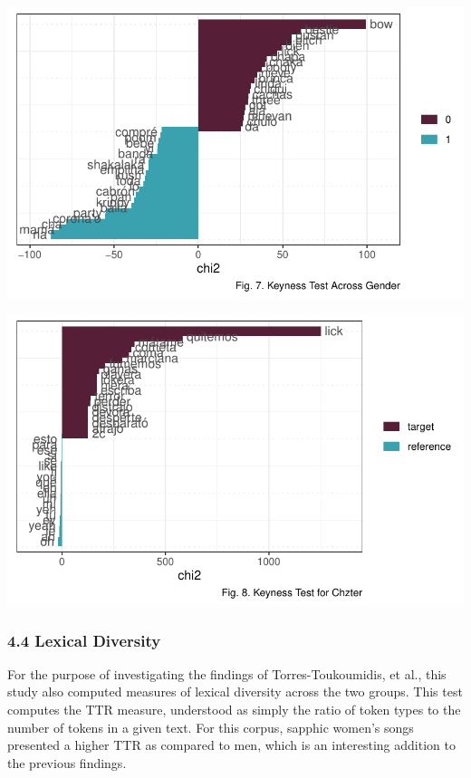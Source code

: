 \documentclass[
  letterpaper,
  DIV=11,
  numbers=noendperiod]{scrartcl}
\begin{document}
\includegraphics{Sastoque_Essay3_files/figure-pdf/keyness-1.pdf}

\includegraphics{Sastoque_Essay3_files/figure-pdf/keyness-2.pdf}

\hypertarget{lexical-diversity}{%
\subsubsection{\texorpdfstring{4.4 \textbf{Lexical
Diversity}}{4.4 Lexical Diversity}}\label{lexical-diversity}}

For the purpose of investigating the findings of Torres-Toukoumidis, et
al., this study also computed measures of lexical diversity across the
two groups. This test computes the TTR measure, understood as simply the
ratio of token types to the number of tokens in a given text. For this
corpus, sapphic women's songs presented a higher TTR as compared to men,
which is an interesting addition to the previous findings.
\end{document}
